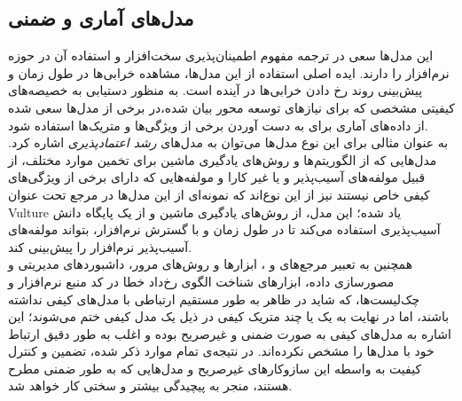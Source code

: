 \subsection{مدل‌های آماری و ضمنی}
این مدل‌ها سعی در ترجمه مفهوم اطمینان‌پذیری سخت‌افزار و استفاده آن در حوزه نرم‌افزار را دارند. ایده اصلی استفاده از این مدل‌ها، مشاهده خرابی‌ها در طول زمان و پیش‌بینی روند رخ دادن خرابی‌ها در آینده است. به منظور دستیابی به خصیصه‌های کیفیتی مشخصی که برای نیازهای توسعه محور بیان شده،در برخی از مدل‌ها سعی شده از داده‌های آماری برای به دست آوردن برخی از ویژگی‌ها و متریک‌ها استفاده شود.\\
به عنوان مثالی برای این نوع مدل‌ها می‌توان به مدل‌های
\textit{رشد اعتمادپذیری}
\cite{musa_software_2004}
اشاره کرد. مدل‌هایی که از الگوریتم‌ها و روش‌های یادگیری ماشین برای تخمین موارد مختلف، از قبیل مولفه‌های آسیب‌پذیر و یا غیر کارا و مولفه‌هایی که دارای برخی از ویژگی‌های کیفی خاص نیستند نیز از این نوع‌اند که نمونه‌ای از این مدل‌ها در مرجع
\cite{neuhaus_predicting_2007}
تحت عنوان Vulture یاد شده؛ این مدل، از روش‌های یادگیری ماشین و از یک پایگاه دانش آسیب‌پذیری استفاده می‌کند تا در طول زمان و با گسترش نرم‌افزار، بتواند مولفه‌های آسیب‌پذیر نرم‌افزار را پیش‌بینی کند.\\
همچنین به تعبیر مرجع‌های
\cite{sommerville_software_2016}
و
\cite{wagner_software_2013}،
ابزارها و روش‌های مرور، داشبوردهای مدیریتی و مصورسازی داده، ابزارهای شناخت الگوی رخ‌داد خطا در کد منبع نرم‌افزار و چک‌لیست‌ها، که شاید در ظاهر به طور مستقیم ارتباطی با مدل‌های کیفی نداشته باشند، اما در نهایت به یک یا چند متریک کیفی در ذیل یک مدل کیفی ختم می‌شوند؛ این اشاره به مدل‌های کیفی به صورت ضمنی و غیرصریح بوده و اغلب به طور دقیق ارتباط خود با مدل‌ها را مشخص نکرده‌اند. در نتیجه‌ی ‌تمام موارد ذکر شده، تضمین و کنترل کیفیت به واسطه این سازوکارهای غیرصریح و مدل‌هایی که به طور ضمنی مطرح هستند، منجر به پیچیدگی بیشتر و سختی کار خواهد شد.

